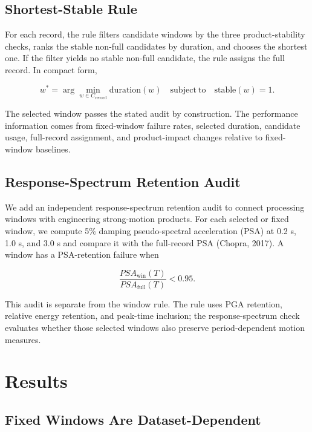 \documentclass[12pt,letterpaper]{article}
\begin{document}
\subsection{Shortest-Stable Rule}\label{shortest-stable-rule}

For each record, the rule filters candidate windows by the three product-stability checks, ranks the stable non-full candidates by duration, and chooses the shortest one. If the filter yields no stable non-full candidate, the rule assigns the full record. In compact form,

\[
w^* = \arg\min_{w \in C_{\mathrm{record}}}
\mathrm{duration}(w)
\quad \mathrm{subject\ to}\quad
\mathrm{stable}(w)=1 .
\]

The selected window passes the stated audit by construction. The performance information comes from fixed-window failure rates, selected duration, candidate usage, full-record assignment, and product-impact changes relative to fixed-window baselines.

\subsection{Response-Spectrum Retention Audit}\label{response-spectrum-retention-audit}

We add an independent response-spectrum retention audit to connect processing windows with engineering strong-motion products. For each selected or fixed window, we compute 5\% damping pseudo-spectral acceleration (PSA) at 0.2 s, 1.0 s, and 3.0 s and compare it with the full-record PSA (Chopra, 2017). A window has a PSA-retention failure when

\[
\frac{PSA_{\mathrm{win}}(T)}{PSA_{\mathrm{full}}(T)} < 0.95 .
\]

This audit is separate from the window rule. The rule uses PGA retention, relative energy retention, and peak-time inclusion; the response-spectrum check evaluates whether those selected windows also preserve period-dependent motion measures.

\section{Results}\label{results}

\subsection{Fixed Windows Are Dataset-Dependent}\label{fixed-windows-are-dataset-dependent}
\end{document}
